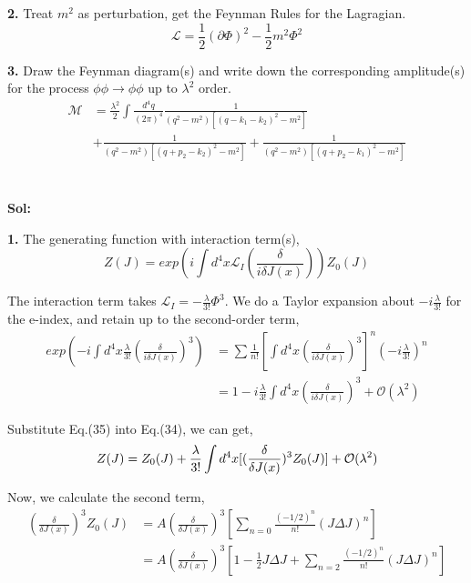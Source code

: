 \documentclass[a4paper]{article}
\begin{document}
\par \textbf{2.} Treat $m^2$ as perturbation, get the Feynman Rules for the Lagragian.
\begin{equation}
    \mathcal{L}=\frac{1}{2}(\partial\Phi)^2-\frac{1}{2}m^2\Phi^2
\end{equation}
\par \textbf{3.} Draw the Feynman diagram(s) and write down the corresponding amplitude(s) for the process $\phi\phi\to\phi\phi$ up to $\lambda^2$ order.
\begin{equation}
    \begin{split}
        \mathcal{M}&=\frac{\lambda^2}{2}\int{\frac{d^4q}{(2\pi)^4}\frac{1}{(q^2-m^2)[(q-k_{1}-k_{2})^2-m^2]}}\\
        &+\frac{1}{(q^2-m^2)[(q+p_{2}-k_{2})^2-m^2]}+\frac{1}{(q^2-m^2)[(q+p_{2}-k_{1})^2-m^2]}
    \end{split}
\end{equation}
\\ \\
\textbf{Sol:}
\par\textbf{1.} The generating function with interaction term(s),
\begin{equation}
    Z(J)=exp(i\int{d^4x\mathcal{L}_{I}(\frac{\delta}{i\delta J(x)})})Z_{0}(J)
\end{equation}
\par The interaction term takes $\mathcal{L}_{I}=-\frac{\lambda}{3!}\Phi^3$. We do a Taylor expansion about $-i\frac{\lambda}{3!}$ for the e-index, and retain up to the second-order term,
\begin{equation}
    \begin{split}
            exp(-i\int{d^4x\frac{\lambda}{3!}(\frac{\delta}{i\delta J(x)})^3})
            &=\sum{\frac{1}{n!}[\int{d^4x(\frac{\delta}{i\delta J(x)})^3}]^{n}(-i\frac{\lambda}{3!})^{n}}\\
            &=1-i\frac{\lambda}{3!}\int{d^4x(\frac{\delta}{i\delta J(x)})^3}+\mathcal{O}(\lambda^2)
    \end{split}
\end{equation}  
\par Substitute Eq.(35) into Eq.(34), we can get,
\begin{equation}
        Z(J)=Z_{0}(J)+\frac{\lambda}{3!}\int{d^4x[(\frac{\delta}{\delta J(x)})^3Z_{0}(J)]}+\mathcal{O}(\lambda^2)\\
\end{equation}
\par Now, we calculate the second term,
\begin{equation}
    \begin{split}
        (\frac{\delta}{\delta J(x)})^3Z_{0}(J)
        &=A(\frac{\delta}{\delta J(x)})^3[\sum_{n=0}{\frac{(-1/2)^n}{n!}(J\Delta J)^n}]\\
        &=A(\frac{\delta}{\delta J(x)})^3[1-\frac{1}{2}J\Delta J+\sum_{n=2}{\frac{(-1/2)^{n}}{n!}(J\Delta J)^n}]
    \end{split}
\end{equation}
\end{document}
